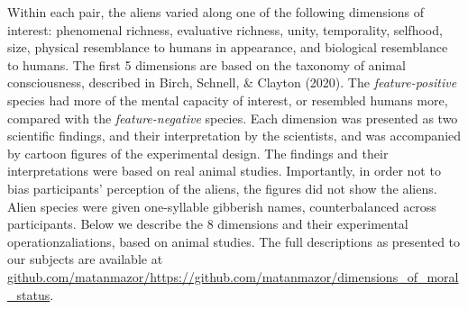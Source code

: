 \documentclass[10pt, letterpaper]{article}
\begin{document}
Within each pair, the aliens varied along one of the following
dimensions of interest: phenomenal richness, evaluative richness, unity,
temporality, selfhood, size, physical resemblance to humans in
appearance, and biological resemblance to humans. The first 5 dimensions
are based on the taxonomy of animal consciousness, described in Birch,
Schnell, \& Clayton (2020). The \emph{feature-positive} species had more
of the mental capacity of interest, or resembled humans more, compared
with the \emph{feature-negative} species. Each dimension was presented
as two scientific findings, and their interpretation by the scientists,
and was accompanied by cartoon figures of the experimental design. The
findings and their interpretations were based on real animal studies.
Importantly, in order not to bias participants' perception of the
aliens, the figures did not show the aliens. Alien species were given
one-syllable gibberish names, counterbalanced across participants. Below
we describe the 8 dimensions and their experimental operationzaliations,
based on animal studies. The full descriptions as presented to our
subjects are available at
\href{github.com/matanmazor/dimensions_of_moral_status}{github.com/matanmazor/https://github.com/matanmazor/dimensions\_of\_moral\_status}.
\end{document}
